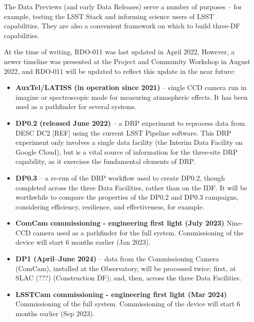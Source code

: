 The Data Previews (and early Data Releases) serve a number of purposes
-- for example, testing the LSST Stack and informing science users of
LSST capabilities. They are also a convenient framework on which
to build three-DF capabilities.

At the time of writing, RDO-011 was last updated in April
2022. However, a newer timeline was presented at the Project and
Community Workshop in August 2022, and RDO-011 will be updated to
reflect this update in the near future:

\begin{itemize}

\item {\bf AuxTel/LATISS (in operation since 2021)} -- single CCD
  camera run in imagine or spectroscopic mode for measuring
  atmospheric effects. It has been used as a pathfinder for several
  systems.
  
\item {\bf DP0.2 (released June 2022)} -- a DRP experiment to
  reprocess data from DESC DC2 [REF] using the current LSST Pipeline
  software. This DRP experiment only involves a single data facility
  (the Interim Data Facility on Google Cloud), but is a vital source
  of information for the three-site DRP capability, as it exercises
  the fundamental elements of DRP.
  
\item {\bf DP0.3} -- a re-run of the DRP workflow used to create DP0.2, though
  completed across the three Data Facilities, rather than on the IDF. It
  will be worthwhile to compare the properties of the DP0.2 and DP0.3
  campaigns, considering efficiency, resilience, and effectiveness,
  for example.

\item{\bf ComCam commissioning - engineering first light (July 2023)}
  Nine-CCD camera used as a pathfinder for the full
  system. Commissioning of the device will start 6 months earlier (Jan
  2023).
  
\item {\bf DP1 (April--June 2024)} -- data from the Commissioning
  Camera (ComCam), installed at the Observatory, will be processed
  twice: first, at SLAC (???) (Construction DF); and, then, across the
  three Data Facilities.

 \item{\bf LSSTCam commissioning - engineering first light (Mar 2024)}
   Commissioning of the full system. Commissioning of the device will
   start 6 months earlier (Sep 2023).
  

\end{itemize}
